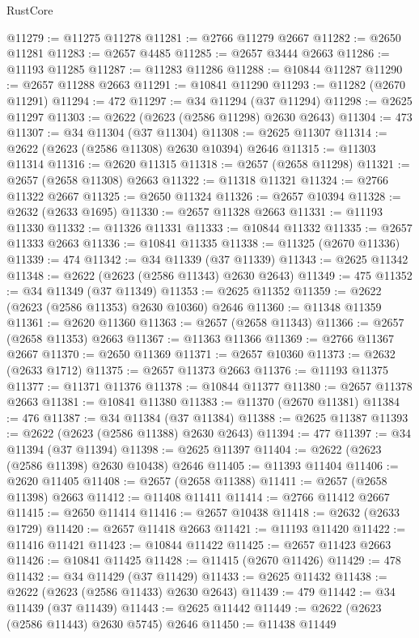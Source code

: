 \begin{lexlean}{RustCore}
\begin{coremodule}
@11279 := @11275 @11278
@11281 := @2766 @11279 @2667
@11282 := @2650 @11281
@11283 := @2657 @4485
@11285 := @2657 @3444 @2663
@11286 := @11193 @11285
@11287 := @11283 @11286
@11288 := @10844 @11287
@11290 := @2657 @11288 @2663
@11291 := @10841 @11290
@11293 := @11282 (@2670 @11291)
@11294 := 472
@11297 := @34 @11294 (@37 @11294)
@11298 := @2625 @11297
@11303 := @2622 (@2623 (@2586 @11298) @2630 @2643)
@11304 := 473
@11307 := @34 @11304 (@37 @11304)
@11308 := @2625 @11307
@11314 := @2622 (@2623 (@2586 @11308) @2630 @10394) @2646
@11315 := @11303 @11314
@11316 := @2620 @11315
@11318 := @2657 (@2658 @11298)
@11321 := @2657 (@2658 @11308) @2663
@11322 := @11318 @11321
@11324 := @2766 @11322 @2667
@11325 := @2650 @11324
@11326 := @2657 @10394
@11328 := @2632 (@2633 @1695)
@11330 := @2657 @11328 @2663
@11331 := @11193 @11330
@11332 := @11326 @11331
@11333 := @10844 @11332
@11335 := @2657 @11333 @2663
@11336 := @10841 @11335
@11338 := @11325 (@2670 @11336)
@11339 := 474
@11342 := @34 @11339 (@37 @11339)
@11343 := @2625 @11342
@11348 := @2622 (@2623 (@2586 @11343) @2630 @2643)
@11349 := 475
@11352 := @34 @11349 (@37 @11349)
@11353 := @2625 @11352
@11359 := @2622 (@2623 (@2586 @11353) @2630 @10360) @2646
@11360 := @11348 @11359
@11361 := @2620 @11360
@11363 := @2657 (@2658 @11343)
@11366 := @2657 (@2658 @11353) @2663
@11367 := @11363 @11366
@11369 := @2766 @11367 @2667
@11370 := @2650 @11369
@11371 := @2657 @10360
@11373 := @2632 (@2633 @1712)
@11375 := @2657 @11373 @2663
@11376 := @11193 @11375
@11377 := @11371 @11376
@11378 := @10844 @11377
@11380 := @2657 @11378 @2663
@11381 := @10841 @11380
@11383 := @11370 (@2670 @11381)
@11384 := 476
@11387 := @34 @11384 (@37 @11384)
@11388 := @2625 @11387
@11393 := @2622 (@2623 (@2586 @11388) @2630 @2643)
@11394 := 477
@11397 := @34 @11394 (@37 @11394)
@11398 := @2625 @11397
@11404 := @2622 (@2623 (@2586 @11398) @2630 @10438) @2646
@11405 := @11393 @11404
@11406 := @2620 @11405
@11408 := @2657 (@2658 @11388)
@11411 := @2657 (@2658 @11398) @2663
@11412 := @11408 @11411
@11414 := @2766 @11412 @2667
@11415 := @2650 @11414
@11416 := @2657 @10438
@11418 := @2632 (@2633 @1729)
@11420 := @2657 @11418 @2663
@11421 := @11193 @11420
@11422 := @11416 @11421
@11423 := @10844 @11422
@11425 := @2657 @11423 @2663
@11426 := @10841 @11425
@11428 := @11415 (@2670 @11426)
@11429 := 478
@11432 := @34 @11429 (@37 @11429)
@11433 := @2625 @11432
@11438 := @2622 (@2623 (@2586 @11433) @2630 @2643)
@11439 := 479
@11442 := @34 @11439 (@37 @11439)
@11443 := @2625 @11442
@11449 := @2622 (@2623 (@2586 @11443) @2630 @5745) @2646
@11450 := @11438 @11449

\end{coremodule}
\end{lexlean}
